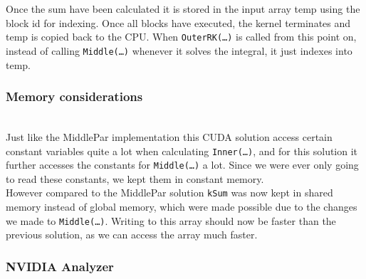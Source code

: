 Once the sum have been calculated it is stored in the input array temp using the block id for indexing. Once all blocks have executed, the kernel terminates and temp is copied back to the CPU. When \texttt{OuterRK(…)} is called from this point on, instead of calling \texttt{Middle(…)} whenever it solves the integral, it just indexes into temp.

\subsubsection{Memory considerations} \hfill \\
Just like the MiddlePar implementation this CUDA solution access certain constant variables quite a lot when calculating \texttt{Inner(…)}, and for this solution it further accesses the constants for \texttt{Middle(…)} a lot. Since we were ever only going to read these constants, we kept them in constant memory.\\

However compared to the MiddlePar solution \texttt{kSum} was now kept in shared memory instead of global memory, which were made possible due to the changes we made to \texttt{Middle(…)}. Writing to this array should now be faster than the previous solution, as we can access the array much faster.

\subsubsection{NVIDIA Analyzer} \hfill \\

